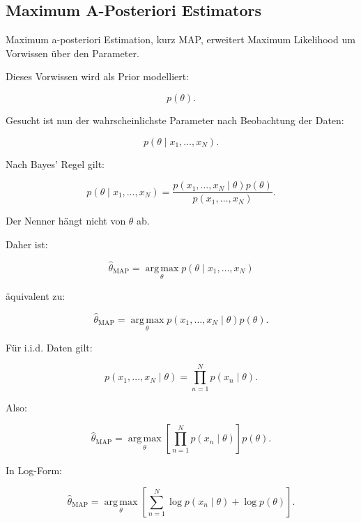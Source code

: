 \documentclass[11pt,a4paper]{scrartcl}
\begin{document}
\subsection{Maximum A-Posteriori Estimators}

\begin{notebox}
    Maximum a-posteriori Estimation, kurz MAP, erweitert Maximum Likelihood um
    Vorwissen über den Parameter.

    Dieses Vorwissen wird als Prior modelliert:

    \[
        p(\theta).
    \]

    Gesucht ist nun der wahrscheinlichste Parameter nach Beobachtung der Daten:

    \[
        p(\theta \mid x_1,\dots,x_N).
    \]
\end{notebox}

\begin{calculationbox}
    Nach Bayes' Regel gilt:

    \[
        p(\theta \mid x_1,\dots,x_N)
        =
        \frac{
            p(x_1,\dots,x_N \mid \theta)p(\theta)
        }{
            p(x_1,\dots,x_N)
        }.
    \]

    Der Nenner hängt nicht von \(\theta\) ab.

    Daher ist:

    \[
        \hat\theta_{\mathrm{MAP}}
        =
        \operatorname*{arg\,max}_{\theta}
        p(\theta \mid x_1,\dots,x_N)
    \]

    äquivalent zu:

    \[
        \hat\theta_{\mathrm{MAP}}
        =
        \operatorname*{arg\,max}_{\theta}
        p(x_1,\dots,x_N \mid \theta)p(\theta).
    \]
\end{calculationbox}

\begin{calculationbox}
    Für i.i.d. Daten gilt:

    \[
        p(x_1,\dots,x_N \mid \theta)
        =
        \prod_{n=1}^{N} p(x_n \mid \theta).
    \]

    Also:

    \[
        \hat\theta_{\mathrm{MAP}}
        =
        \operatorname*{arg\,max}_{\theta}
        \left[
            \prod_{n=1}^{N}
            p(x_n \mid \theta)
        \right]
        p(\theta).
    \]

    In Log-Form:

    \[
        \hat\theta_{\mathrm{MAP}}
        =
        \operatorname*{arg\,max}_{\theta}
        \left[
            \sum_{n=1}^{N}
            \log p(x_n \mid \theta)
            +
            \log p(\theta)
        \right].
    \]
\end{calculationbox}
\end{document}
